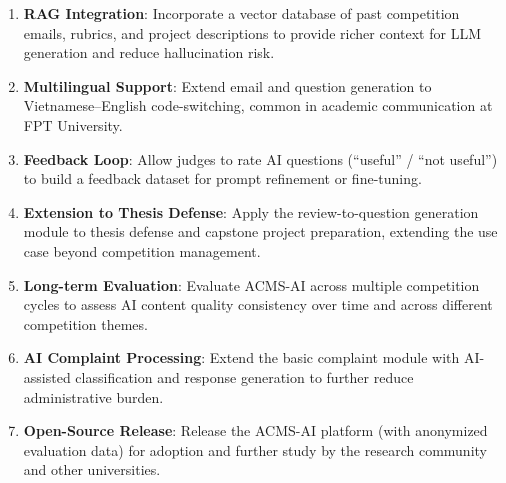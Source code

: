 \documentclass[runningheads]{llncs}
\begin{document}
\begin{enumerate}
  \item \textbf{RAG Integration}: Incorporate a vector database of past competition emails, rubrics, and project descriptions to provide richer context for LLM generation and reduce hallucination risk.
  \item \textbf{Multilingual Support}: Extend email and question generation to Vietnamese--English code-switching, common in academic communication at FPT University.
  \item \textbf{Feedback Loop}: Allow judges to rate AI questions (``useful'' / ``not useful'') to build a feedback dataset for prompt refinement or fine-tuning.
  \item \textbf{Extension to Thesis Defense}: Apply the review-to-question generation module to thesis defense and capstone project preparation, extending the use case beyond competition management.
  \item \textbf{Long-term Evaluation}: Evaluate ACMS-AI across multiple competition cycles to assess AI content quality consistency over time and across different competition themes.
  \item \textbf{AI Complaint Processing}: Extend the basic complaint module with AI-assisted classification and response generation to further reduce administrative burden.
  \item \textbf{Open-Source Release}: Release the ACMS-AI platform (with anonymized evaluation data) for adoption and further study by the research community and other universities.
\end{enumerate}
\end{document}
